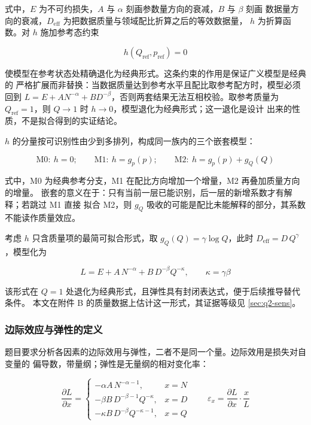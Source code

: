 \documentclass[bwprint]{gmcmthesis}
\numberwithin{equation}{section}
\numberwithin{figure}{section}
\numberwithin{table}{section}
\begin{document}
式中，$E$ 为不可约损失，$A$ 与 $\alpha$ 刻画参数量方向的衰减，$B$ 与 $\beta$ 刻画
数据量方向的衰减，$D_{\mathrm{eff}}$ 为把数据质量与领域配比折算之后的等效数据量，
$h$ 为折算函数。对 $h$ 施加参考态约束

\begin{equation}
h(Q_{\mathrm{ref}},p_{\mathrm{ref}})=0
\end{equation}

使模型在参考状态处精确退化为经典形式。这条约束的作用是保证广义模型是经典的
严格扩展而非替换：当数据质量达到参考水平且配比取参考配方时，模型必须回到
$L=E+AN^{-\alpha}+BD^{-\beta}$，否则两套结果无法互相校验。取参考质量为
$Q_{\mathrm{ref}}=1$，则 $Q\to 1$ 时 $h\to 0$，模型退化为经典形式；这一退化是设计
出来的性质，不是拟合得到的实证结论。

$h$ 的分量按可识别性由少到多排列，构成同一族内的三个嵌套模型：

\begin{equation}
\text{M0}:\ h=0;\qquad
\text{M1}:\ h=g_p(p);\qquad
\text{M2}:\ h=g_p(p)+g_Q(Q)
\end{equation}

式中，M0 为经典参考分支，M1 在配比方向增加一个增量，M2 再叠加质量方向的增量。
嵌套的意义在于：只有当前一层已能识别，后一层的新增系数才有解释；若跳过 M1 直接
拟合 M2，则 $g_Q$ 吸收的可能是配比未能解释的部分，其系数不能读作质量效应。

考虑 $h$ 只含质量项的最简可拟合形式，取 $g_Q(Q)=\gamma\log Q$，此时
$D_{\mathrm{eff}}=D\,Q^{\gamma}$，模型化为

\begin{equation}
L=E+A\,N^{-\alpha}+B\,D^{-\beta}Q^{-\kappa},\qquad \kappa=\gamma\beta
\end{equation}

该形式在 $Q=1$ 处退化为经典形式，且弹性具有封闭表达式，便于后续推导替代条件。
本文在附件 B 的质量数据上估计这一形式，其证据等级见 \ref{sec:q2-sens}。

\subsubsection{边际效应与弹性的定义}

题目要求分析各因素的边际效用与弹性，二者不是同一个量。边际效用是损失对自变量的
偏导数，带量纲；弹性是无量纲的相对变化率：

\begin{equation}
\frac{\partial L}{\partial x}
=\begin{cases}
-\alpha A\,N^{-\alpha-1}, & x=N\\[2pt]
-\beta B\,D^{-\beta-1}Q^{-\kappa}, & x=D\\[2pt]
-\kappa B\,D^{-\beta}Q^{-\kappa-1}, & x=Q
\end{cases}
\qquad
\varepsilon_x=\frac{\partial L}{\partial x}\cdot\frac{x}{L}
\end{equation}
\end{document}
